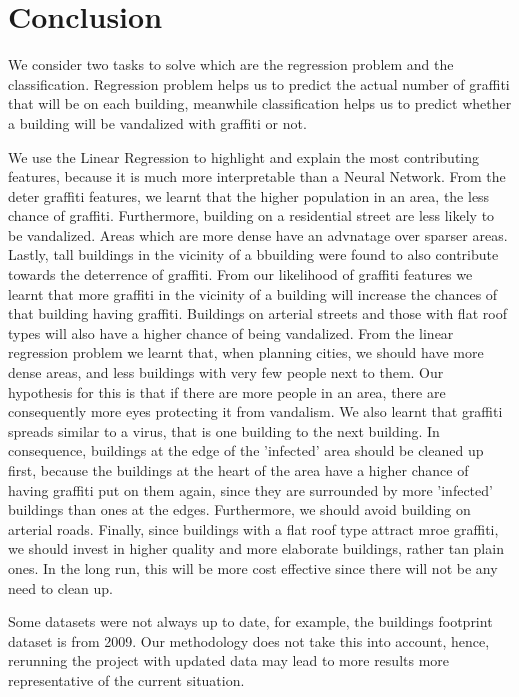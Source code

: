 \chapter{Conclusion}

We consider two tasks to solve which are the regression problem and the classification. Regression problem helps us to predict the actual number of graffiti that will be on each building, meanwhile classification helps us to predict whether a building will be vandalized with graffiti or not.


We use the Linear Regression to highlight and explain the most contributing features, because it is much more interpretable than a Neural Network. From the deter graffiti features, we learnt that the higher population in an area, the less chance of graffiti. Furthermore, building on a residential street are less likely to be vandalized. Areas which are more dense have an advnatage over sparser areas. Lastly, tall buildings in the vicinity of a bbuilding were found to also contribute towards the deterrence of graffiti.
From our likelihood of graffiti features we learnt that more graffiti  in the vicinity of a building will increase the chances of that building having graffiti. Buildings on arterial streets and those with flat roof types will also have a higher chance of being vandalized.
From the linear regression problem we learnt that, when planning cities, we should have more dense areas, and less buildings with very few people next to them. Our hypothesis for this is that if there are more people in an area, there are consequently more eyes protecting it from vandalism. We also learnt that graffiti spreads similar to a virus, that is one building to the next building. In consequence, buildings at the edge of the 'infected' area should be cleaned up first, because the buildings at the  heart of the area have a higher chance of having graffiti put on them again, since they are surrounded by more 'infected' buildings than ones at the edges. Furthermore, we should avoid building on arterial roads. Finally, since buildings with a flat roof type attract mroe graffiti, we should invest in higher quality and more elaborate buildings, rather tan plain ones. In the long run, this will be more cost  effective since there will not be any need to clean up.

Some datasets were not always up to date, for example, the buildings footprint dataset is from 2009. Our methodology does not take this into account, hence, rerunning the project with updated data may lead to more results more representative of the current situation.

